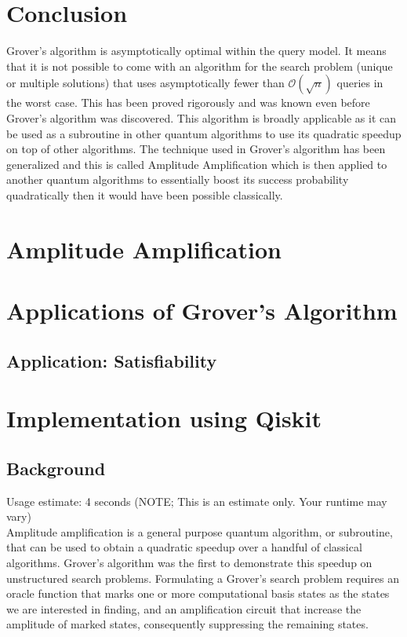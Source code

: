 \documentclass[12pt, oneside]{book}
\theoremstyle{definition}
\theoremstyle{definition}
\theoremstyle{remark}
\begin{document}
\section{Conclusion}
Grover's algorithm  is asymptotically optimal within the query model. It means that it is not possible to come with an algorithm for the search problem (unique or multiple solutions) that uses asymptotically fewer than $\mathcal{O}(\sqrt{n})$ queries in the worst case. This has been proved rigorously and was known even before Grover's algorithm was discovered. This algorithm is broadly applicable as it can be used as a subroutine in other quantum algorithms to use its quadratic speedup on top of other algorithms. The technique used in Grover's algorithm has been generalized and this is called Amplitude Amplification which is then applied to another quantum algorithms to essentially boost its success probability quadratically then it would have been possible classically.
\section{Amplitude Amplification}
\section{Applications of Grover's Algorithm}
\subsection{Application: Satisfiability}
\section{Implementation using Qiskit}
\subsection{Background}
Usage estimate: 4 seconds (NOTE; This is an estimate only. Your runtime may vary)\\
Amplitude amplification is a general purpose quantum algorithm, or subroutine, that can be used to obtain a quadratic speedup over a handful of classical algorithms. Grover's algorithm was the first to demonstrate this speedup on unstructured search problems. Formulating a Grover's search problem requires an oracle function that marks one or more computational basis states as the states we are interested in finding, and an amplification circuit that increase the amplitude of marked states, consequently suppressing the remaining states.
\end{document}
